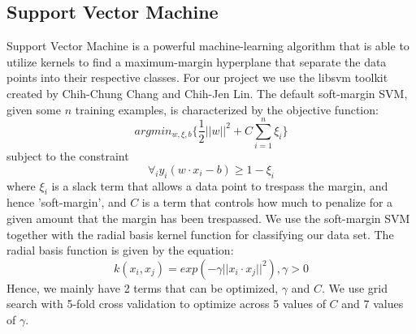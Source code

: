 \documentclass{article} %
\begin{document}
\subsection{Support Vector Machine}

Support Vector Machine is a powerful machine-learning algorithm that is able to utilize kernels to find a maximum-margin hyperplane that separate the data points into their respective classes. For our project we use the libsvm toolkit created by Chih-Chung Chang and Chih-Jen Lin. The default soft-margin SVM, given some $n$ training examples, is characterized by the objective function:
$$argmin_{w, \xi, b}\{\frac{1}{2}||w||^2 + C\sum^n_{i=1}\xi_i\}$$
subject to the constraint
$$\forall_i y_i(w\cdot{x_i}-b) \geq 1 - \xi_i$$
where $\xi_i$ is a slack term that allows a data point to trespass the margin, and hence 'soft-margin', and $C$ is a term that controls how much to penalize for a given amount that the margin has been trespassed. We use the soft-margin SVM together with the radial basis kernel function for classifying our data set. The radial basis function is given by the equation:
$$k(x_i, x_j) = exp(-\gamma||x_i\cdot{x_j}||^2), \gamma > 0$$
Hence, we mainly have 2 terms that can be optimized, $\gamma$ and $C$.
We use grid search with 5-fold cross validation to optimize across 5 values of $C$ and 7 values of $\gamma$.\\
\end{document}
